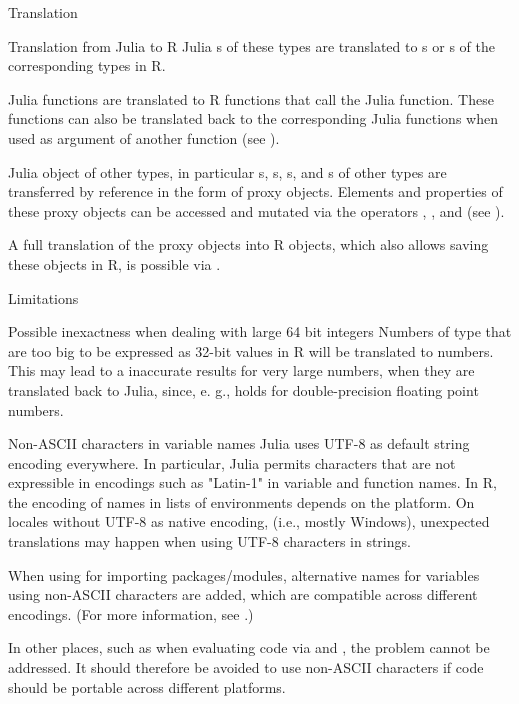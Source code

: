 \begin{Section}{Translation}
\begin{SubSection}{Translation from Julia to R}
Julia s of these types are translated to s or s of the corresponding types in R.


Julia functions are translated to R functions that call the Julia function.
These functions can also be translated back to the
corresponding Julia functions when used as argument of another function
(see ).


Julia object of other types, in particular s, s, s,
and s of other types are transferred by reference in the form of proxy objects.
Elements and properties of these proxy objects can be accessed and mutated via the operators \code{`[[`},
\code{`[`}, and  (see ).

A full translation of the proxy objects into R objects, which also allows saving these objects in R,
is possible via .


\end{SubSection}

\end{Section}
%
\begin{Section}{Limitations}

%
\begin{SubSection}{Possible inexactness when dealing with large 64 bit integers}
Numbers of type  that are too big to be expressed as 32-bit
 values in R will be translated to  numbers.
This may lead to a inaccurate results for very large numbers,
when they are translated back to Julia, since, e. g.,
 holds for double-precision
floating point numbers.
\end{SubSection}


%
\begin{SubSection}{Non-ASCII characters in variable names}
Julia uses UTF-8 as default string encoding everywhere.
In particular, Julia permits characters that are not
expressible in encodings such as "Latin-1" in variable and function names.
In R, the encoding of names in lists of environments depends on the platform.
On locales without UTF-8 as native encoding, (i.e., mostly Windows),
unexpected translations may happen when using UTF-8 characters in strings.

When using  for importing packages/modules,
alternative names for variables using non-ASCII characters are added,
which are compatible across different encodings.
(For more information, see .)

In other places, such as when evaluating code via  and
, the problem cannot be addressed.
It should therefore be avoided to use non-ASCII characters
if code should be portable across different platforms.
\end{SubSection}

\end{Section}
